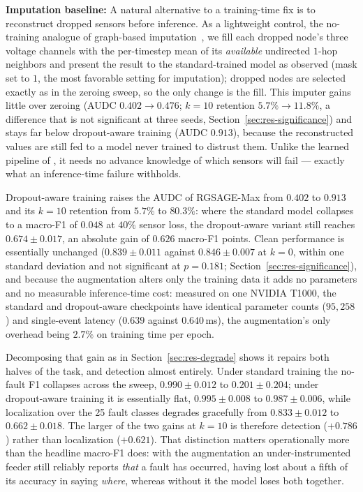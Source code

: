 \documentclass[3p,times,procedia]{elsarticle}
\begin{document}
\textbf{Imputation baseline:} A natural alternative to a training-time fix is to reconstruct dropped sensors before inference. As a lightweight control, the no-training analogue of graph-based imputation~\cite{zhang2025}, we fill each dropped node's three voltage channels with the per-timestep mean of its \emph{available} undirected $1$-hop neighbors and present the result to the standard-trained model as observed (mask set to $1$, the most favorable setting for imputation); dropped nodes are selected exactly as in the zeroing sweep, so the only change is the fill. This imputer gains little over zeroing (AUDC $0.402\!\to\!0.476$; $k=10$ retention $5.7\%\!\to\!11.8\%$, a difference that is not significant at three seeds, Section~\ref{sec:res-significance}) and stays far below dropout-aware training (AUDC $0.913$), because the reconstructed values are still fed to a model never trained to distrust them. Unlike the learned pipeline of \cite{zhang2025}, it needs no advance knowledge of which sensors will fail --- exactly what an inference-time failure withholds.

Dropout-aware training raises the AUDC of RGSAGE-Max from $0.402$ to $0.913$ and its $k=10$ retention from $5.7\%$ to $80.3\%$: where the standard model collapses to a macro-F1 of $0.048$ at $40\%$ sensor loss, the dropout-aware variant still reaches $0.674\pm0.017$, an absolute gain of $0.626$ macro-F1 points. Clean performance is essentially unchanged ($0.839\pm0.011$ against $0.846\pm0.007$ at $k=0$, within one standard deviation and not significant at $p=0.181$; Section~\ref{sec:res-significance}), and because the augmentation alters only the training data it adds no parameters and no measurable inference-time cost: measured on one NVIDIA T1000, the standard and dropout-aware checkpoints have identical parameter counts ($95{,}258$) and single-event latency ($0.639$ against $0.640$\,ms), the augmentation's only overhead being $2.7\%$ on training time per epoch.

Decomposing that gain as in Section~\ref{sec:res-degrade} shows it repairs both halves of the task, and detection almost entirely. Under standard training the no-fault F1 collapses across the sweep, $0.990\pm0.012$ to $0.201\pm0.204$; under dropout-aware training it is essentially flat, $0.995\pm0.008$ to $0.987\pm0.006$, while localization over the 25 fault classes degrades gracefully from $0.833\pm0.012$ to $0.662\pm0.018$. The larger of the two gains at $k=10$ is therefore detection ($+0.786$) rather than localization ($+0.621$). That distinction matters operationally more than the headline macro-F1 does: with the augmentation an under-instrumented feeder still reliably reports \emph{that} a fault has occurred, having lost about a fifth of its accuracy in saying \emph{where}, whereas without it the model loses both together.
\end{document}
